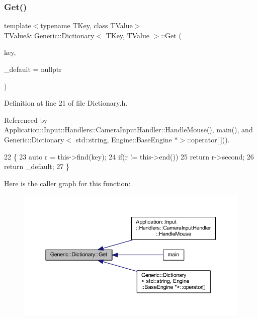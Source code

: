 \subsubsection{\texorpdfstring{Get()}{Get()}}
{\footnotesize\ttfamily template$<$typename T\+Key, class T\+Value$>$ \\
T\+Value\& \mbox{\hyperlink{classGeneric_1_1Dictionary}{Generic\+::\+Dictionary}}$<$ T\+Key, T\+Value $>$\+::Get (\begin{DoxyParamCaption}\item[{const T\+Key}]{key,  }\item[{T\+Value}]{\+\_\+default = {\ttfamily nullptr} }\end{DoxyParamCaption})\hspace{0.3cm}{\ttfamily [inline]}}



Definition at line 21 of file Dictionary.\+h.



Referenced by Application\+::\+Input\+::\+Handlers\+::\+Camera\+Input\+Handler\+::\+Handle\+Mouse(), main(), and Generic\+::\+Dictionary$<$ std\+::string, Engine\+::\+Base\+Engine $\ast$$>$\+::operator\mbox{[}$\,$\mbox{]}().


\begin{DoxyCode}
22         \{
23             \textcolor{keyword}{auto} r = this->find(key);
24             \textcolor{keywordflow}{if}(r != this->end())
25                 \textcolor{keywordflow}{return} r->second;
26             \textcolor{keywordflow}{return} \_default;
27         \}
\end{DoxyCode}
Here is the caller graph for this function\+:
\nopagebreak
\begin{figure}[H]
\begin{center}
\leavevmode
\includegraphics[width=350pt]{classGeneric_1_1Dictionary_ad018bc166486129b48e9ededce313984_icgraph}
\end{center}
\end{figure}
\mbox{\label{classGeneric_1_1Dictionary_ab4c4fca6ab2ea15fcccd88fe2213575e}} 
